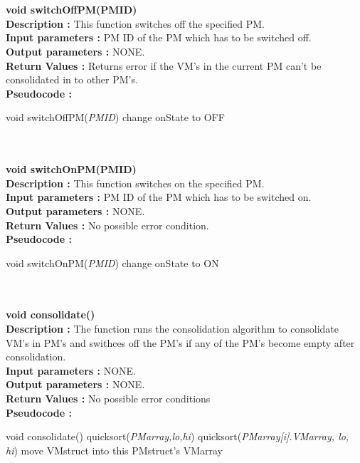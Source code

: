 \documentclass[a4paper,11pt]{article}
\begin{document}
\mbox{}\\\\
\textbf{ void switchOffPM(PM\textunderscore ID)}
\\
\textbf{Description :} This function switches off the specified PM.
\\
\textbf{Input parameters :} PM ID of the PM which has to be switched off.
\\
\textbf{Output parameters :} NONE.
\\
\textbf{Return Values :} Returns error if the VM's in the current PM can't be consolidated in to other PM's.
\\
\textbf{Pseudocode :}
\begin{algorithmic}[1]
\STATE void switchOffPM(\emph{PM\textunderscore ID})
\STATE change onState to OFF
\ENDIF
\ENDFOR
\end{algorithmic}
\mbox{}\\\\
\textbf{ void switchOnPM(PM\textunderscore ID)}
\\
\textbf{Description :} This function switches on the specified PM.
\\
\textbf{Input parameters :} PM ID of the PM which has to be switched on.
\\
\textbf{Output parameters :} NONE.
\\
\textbf{Return Values :} No possible error condition.
\\
\textbf{Pseudocode :}
\begin{algorithmic}[1]
\STATE void switchOnPM(\emph{PM\textunderscore ID})
\STATE change onState to ON
\ENDIF
\ENDFOR
\end{algorithmic}
\mbox{}\\\\
\textbf{ void consolidate()}
\\
\textbf{Description :} The function runs the consolidation algorithm to consolidate VM's in PM's and swithces 
off the PM's if any of the PM's become empty after consolidation.
\\
\textbf{Input parameters :} NONE.
\\
\textbf{Output parameters :} NONE.
\\
\textbf{Return Values :} No possible error conditions
\\
\textbf{Pseudocode :}
\begin{algorithmic}[1]
\STATE void consolidate()
\STATE quicksort(\emph{PMarray,lo,hi}) 
\STATE quicksort(\emph{PMarray[i].VMarray, lo, hi}) 
\STATE move VMstruct into this PMstruct's VMarray
\ENDIF
\ENDFOR
\ENDFOR
\ENDFOR
\end{algorithmic}
\end{document}
